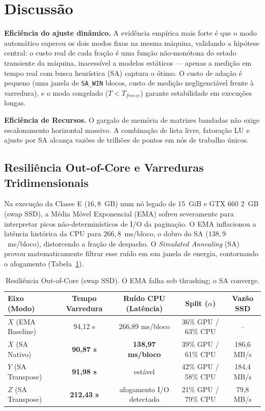 \documentclass[12pt]{article}
\begin{document}
\section{Discussão}\label{sec:disc}

\textbf{Eficiência do ajuste dinâmico.} A evidência empírica mais forte é
que o modo automático superou os dois modos fixos na mesma máquina,
validando a hipótese central: o custo real de cada fração é uma função
não-monótona do estado transiente da máquina, inacessível a modelos
estáticos — apenas a medição em tempo real com busca heurística (SA)
captura o ótimo. O custo de
adação é pequeno (uma janela de \texttt{SA\_WIN} blocos, custo de medição
negligenciável frente à varredura), e o modo congelado ($T <
T_{freeze}$) garante estabilidade em execuções longas.

\noindent\textbf{Eficiência de Recursos.} O gargalo de memória de matrizes bandadas não exige escalonamento horizontal massivo. A combinação de lista livre, fatoração LU e ajuste por SA alcança vazões de trilhões de pontos em nós de trabalho únicos.

\subsection{Resiliência Out-of-Core e Varreduras Tridimensionais}
Na execução da Classe E ($16{,}8$~GB) num nó legado de 15~GiB e GTX 660 2~GB (swap SSD), a Média Móvel Exponencial (EMA) sofreu severamente para interpretar picos não-determinísticos de I/O da paginação. O EMA inflacionou a latência histórica da CPU para $266{,}8$~ms/bloco, o dobro do SA ($138{,}9$~ms/bloco), distorcendo a fração de despacho. O \textit{Simulated Annealing} (SA) provou matematicamente filtrar esse ruído em sua janela de energia, contornando o afogamento (Tabela~\ref{tab:super_ooc}).

\begin{table}[htbp]
\centering
\caption{Resiliência Out-of-Core (swap SSD). O EMA falha sob thrashing; o SA converge.}
\label{tab:super_ooc}
\scriptsize
\begin{tabular}{lcccc}
\toprule
\textbf{Eixo (Modo)} & \textbf{Tempo Varredura} & \textbf{Ruído CPU (Latência)} & \textbf{Split ($\alpha$)} & \textbf{Vazão SSD} \\
\midrule
$X$ (EMA Baseline) & 94,12 s & 266,89 ms/bloco & 36\% GPU / 63\% CPU & -- \\
$X$ (SA Nativo) & \textbf{90,87 s} & \textbf{138,97 ms/bloco} & 39\% GPU / 61\% CPU & 186,6 MB/s \\
$Y$ (SA Transpose) & \textbf{91,98 s} & estável & 42\% GPU / 58\% CPU & 184,4 MB/s \\
$Z$ (SA Transpose) & \textbf{212,43 s} & afogamento I/O detectado & 21\% GPU / 79\% CPU & 79,8 MB/s \\
\bottomrule
\end{tabular}
\end{table}
\end{document}
